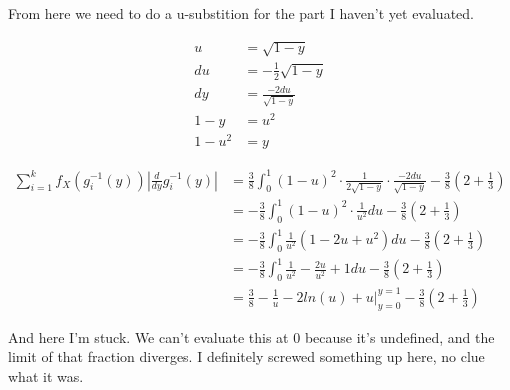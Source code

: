 From here we need to do a u-substition for the part I haven't yet evaluated.

\begin{align*}
	u &= \sqrt{1-y} \\
	du &= -\frac{1}{2} \sqrt{1-y} \\
	dy &= \frac{-2du}{\sqrt{1-y}} \\
	1-y &= u^2 \\
	1 - u^2 &= y
\end{align*}

\begin{align*}
	\sum_{i=1}^k f_X(g_i^{-1}(y)) \left| \frac{d}{dy}g_i^{-1}(y) \right|
	&= \frac{3}{8} \int_0^1 (1-u)^2 \cdot \frac{1}{2\sqrt{1-y}} \cdot \frac{-2du}{\sqrt{1-y}} - \frac{3}{8} \left( 2 + \frac{1}{3} \right) \\
	&= -\frac{3}{8} \int_0^1 (1-u)^2 \cdot \frac{1}{u^2} du - \frac{3}{8} \left( 2 + \frac{1}{3} \right) \\
	&= -\frac{3}{8} \int_0^1 \frac{1}{u^2}(1-2u+u^2) du - \frac{3}{8} \left( 2 + \frac{1}{3} \right) \\
	&= -\frac{3}{8} \int_0^1 \frac{1}{u^2} - \frac{2u}{u^2} + 1 du - \frac{3}{8} \left( 2 + \frac{1}{3} \right) \\
	&= \frac{3}{8} - \frac{1}{u} - 2ln(u) + u \bigg\rvert_{y=0}^{y=1} -  \frac{3}{8} \left( 2 + \frac{1}{3} \right) 
\end{align*}

And here I'm stuck. We can't evaluate this at 0 because it's undefined, and the limit of that fraction diverges. I definitely screwed something up here, no clue what it was.
